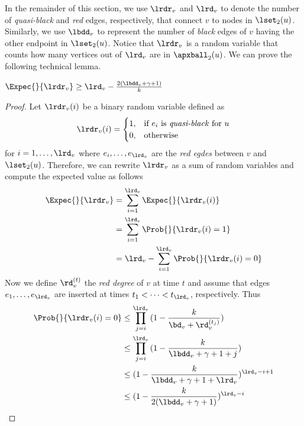 In the remainder of this section, we use $\lrdr_v$ and $\lrd_v$ to denote the number of \emph{quasi-black} and \emph{red} edges, respectively, that connect $v$ to nodes in $\lset_2(u)$. Similarly, we use $\lbdd_v$ to represent the number of \emph{black} edges of $v$ having the other endpoint in $\lset_2(u)$. Notice that  $\lrdr_v$ is a random variable that counts how many vertices out of $\lrd_v$ are in $\apxball_2(u)$. We can prove the following technical lemma.
\begin{lemma}\label{le:gamma_ok_expect_lowerbound}
     $\Expec{}{\lrdr_v} \geq \lrd_v - \frac{2(\lbdd_v + \gamma + 1)}{k}$
\end{lemma}
\begin{proof}
    Let $\lrdr_v(i)$ be a binary random variable defined as
    \begin{equation*}
    \lrdr_v(i)=
    \begin{cases}
      1, & \text{if}\ e_i \ \text{is \emph{quasi-black} for} \ u \\
      0, & \text{otherwise}
    \end{cases}
  \end{equation*}
    for $i=1,\dots,\lrd_v$ where $e_i,\dots, e_{\lrd_v}$ are the \emph{red egdes} between $v$ and $\lset_2(u)$. Therefore, we can rewrite $\lrdr_v$ as a sum of random variables and compute the expected value as follows
  \begin{align}\label{eq:gamma_ok_lb_fact_eq_1}
      \nonumber \Expec{}{\lrdr_v} &= \sum_{i=1}^{\lrd_v}{\Expec{}{\lrdr_v(i)}}  \notag \\
      \nonumber &= \sum_{i=1}^{\lrd_v}{\Prob{}{\lrdr_v(i)=1}} \notag \\
      &= \lrd_v - \sum_{i=1}^{\lrd_v} {\Prob{}{\lrdr_v(i)=0}} 
  \end{align}
    Now we define $\rd_v^{(t)}$ the \emph{red degree} of $v$ at time $t$ and assume that edges $e_1,\dots,e_{\lrd_v}$ are inserted at times $t_1 < \dots < t_{\lrd_v}$, respectively. Thus
  \begin{align} \label{eq:gamma_ok_lb_fact_eq_2}
      \Prob{}{\lrdr_v(i) = 0} &\leq \prod_{j=i}^{\lrd_v}{(1-\frac{k}{\bd_v + \rd_v^{(t_j)}})} \notag\\
      &\leq \prod_{j=i}^{\lrd_v}{(1-\frac{k}{\lbdd_v + \gamma + 1 + j})} \notag \\
      &\leq (1-\frac{k}{\lbdd_v + \gamma + 1 + \lrd_v})^{\lrd_v - i + 1} \notag \\
      &\leq (1-\frac{k}{2(\lbdd_v + \gamma + 1)})^{\lrd_v - i}
  \end{align}


\end{proof}
